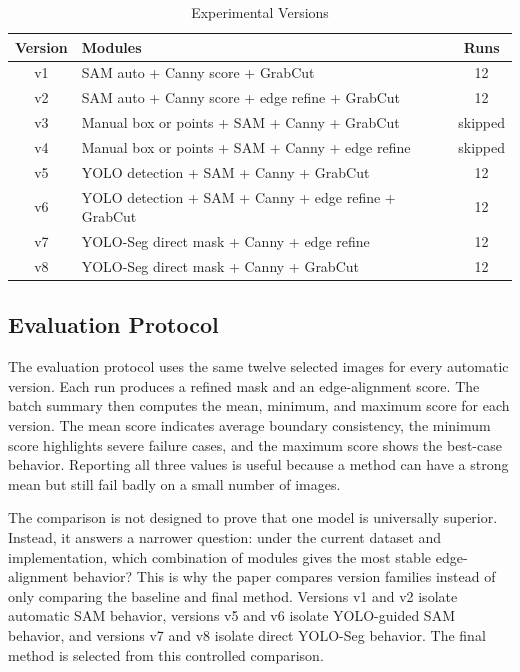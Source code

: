 \documentclass[conference]{IEEEtran}
\begin{document}
\begin{table}[htbp]
\caption{Experimental Versions}
\begin{center}
\small
\setlength{\tabcolsep}{3pt}
\renewcommand{\arraystretch}{1.15}
\begin{tabular}{|c|L{5.35cm}|c|}
\hline
\textbf{Version} & \textbf{Modules} & \textbf{Runs} \\
\hline
v1 & SAM auto + Canny score + GrabCut & 12 \\
\hline
v2 & SAM auto + Canny score + edge refine + GrabCut & 12 \\
\hline
v3 & Manual box or points + SAM + Canny + GrabCut & skipped \\
\hline
v4 & Manual box or points + SAM + Canny + edge refine & skipped \\
\hline
v5 & YOLO detection + SAM + Canny + GrabCut & 12 \\
\hline
v6 & YOLO detection + SAM + Canny + edge refine + GrabCut & 12 \\
\hline
v7 & YOLO-Seg direct mask + Canny + edge refine & 12 \\
\hline
v8 & YOLO-Seg direct mask + Canny + GrabCut & 12 \\
\hline
\end{tabular}
\label{tab:versions}
\end{center}
\end{table}

\subsection{Evaluation Protocol}
The evaluation protocol uses the same twelve selected images for every automatic version. Each run produces a refined mask and an edge-alignment score. The batch summary then computes the mean, minimum, and maximum score for each version. The mean score indicates average boundary consistency, the minimum score highlights severe failure cases, and the maximum score shows the best-case behavior. Reporting all three values is useful because a method can have a strong mean but still fail badly on a small number of images.

The comparison is not designed to prove that one model is universally superior. Instead, it answers a narrower question: under the current dataset and implementation, which combination of modules gives the most stable edge-alignment behavior? This is why the paper compares version families instead of only comparing the baseline and final method. Versions v1 and v2 isolate automatic SAM behavior, versions v5 and v6 isolate YOLO-guided SAM behavior, and versions v7 and v8 isolate direct YOLO-Seg behavior. The final method is selected from this controlled comparison.
\end{document}
